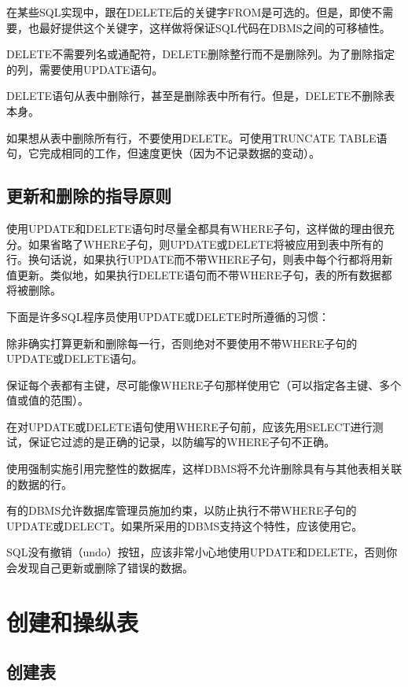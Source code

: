 在某些SQL实现中，跟在DELETE后的关键字FROM是可选的。但是，即使不需要，也最好提供这个关键字，这样做将保证SQL代码在DBMS之间的可移植性。

DELETE不需要列名或通配符，DELETE删除整行而不是删除列。为了删除指定的列，需要使用UPDATE语句。

DELETE语句从表中删除行，甚至是删除表中所有行。但是，DELETE不删除表本身。

如果想从表中删除所有行，不要使用DELETE。可使用TRUNCATE TABLE语句，它完成相同的工作，但速度更快（因为不记录数据的变动）。


\subsection{更新和删除的指导原则}


使用UPDATE和DELETE语句时尽量全都具有WHERE子句，这样做的理由很充分。如果省略了WHERE子句，则UPDATE或DELETE将被应用到表中所有的行。换句话说，如果执行UPDATE而不带WHERE子句，则表中每个行都将用新值更新。类似地，如果执行DELETE语句而不带WHERE子句，表的所有数据都将被删除。

下面是许多SQL程序员使用UPDATE或DELETE时所遵循的习惯：


\begin{compactitem}
\item 除非确实打算更新和删除每一行，否则绝对不要使用不带WHERE子句的UPDATE或DELETE语句。
\item 保证每个表都有主键，尽可能像WHERE子句那样使用它（可以指定各主键、多个值或值的范围）。
\item 在对UPDATE或DELETE语句使用WHERE子句前，应该先用SELECT进行测试，保证它过滤的是正确的记录，以防编写的WHERE子句不正确。
\item 使用强制实施引用完整性的数据库，这样DBMS将不允许删除具有与其他表相关联的数据的行。
\item 有的DBMS允许数据库管理员施加约束，以防止执行不带WHERE子句的UPDATE或DELECT。如果所采用的DBMS支持这个特性，应该使用它。
\end{compactitem}

SQL没有撤销（undo）按钮，应该非常小心地使用UPDATE和DELETE，否则你会发现自己更新或删除了错误的数据。




\section{创建和操纵表}


\subsection{创建表}


